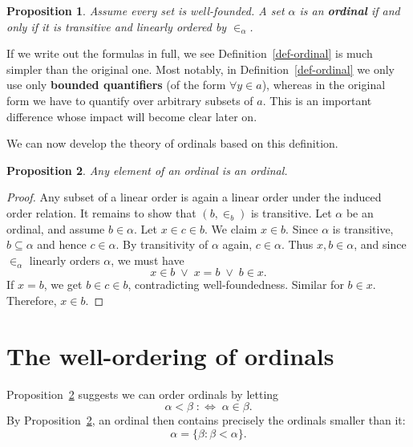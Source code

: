 \documentclass{article}
\newtheorem{proposition}{Proposition}[section]
\begin{document}
\begin{proposition}\label{pro-ordinal-linear-order}Assume every set is well-founded. A set $\alpha$ is an \textbf{ordinal} if and only if it is transitive and linearly ordered by $\in_\alpha$.

\end{proposition}If we write out the formulas in full, we see Definition~\ref{def-ordinal} is much simpler than the original one. Most notably, in Definition~\ref{def-ordinal} we only use only \textbf{bounded quantifiers} (of the form $\forall y \in a$), whereas in the original form we have to quantify over arbitrary subsets of $a$. This is an important difference whose impact will become clear later on.

We can now develop the theory of ordinals based on this definition.

\begin{proposition}\label{pro-ordinal-elements-are-ordinals}Any element of an ordinal is an ordinal.

\end{proposition}\begin{proof}Any subset of a linear order is again a linear order under the induced order relation. It remains to show that $(b, \in_b)$ is transitive. Let $\alpha$ be an ordinal, and assume $b \in \alpha$. Let $x \in c \in b$. We claim $x \in b$. Since $\alpha$ is transitive, $b \subseteq \alpha$ and hence $c \in \alpha$. By transitivity of $\alpha$ again, $c \in \alpha$. Thus $x,b \in \alpha$, and since $\in_\alpha$ linearly orders $\alpha$, we must have
\begin{equation}

x \in b \; \vee \; x = b \; \vee \; b \in x.
\end{equation}
If $x = b$, we get $b \in c \in b$, contradicting well-foundedness. Similar for $b \in x$. Therefore, $x \in b$.

\end{proof}\section{The well-ordering of ordinals}

Proposition~\ref{pro-ordinal-elements-are-ordinals} suggests we can order ordinals by letting
\begin{equation}

\alpha < \beta \; :\iff \; \alpha \in \beta.
\end{equation}
By Proposition~\ref{pro-ordinal-elements-are-ordinals}, an ordinal then contains precisely the ordinals smaller than it:
\begin{equation}

\alpha = \{ \beta : \beta < \alpha \}.
\end{equation}
\end{document}
